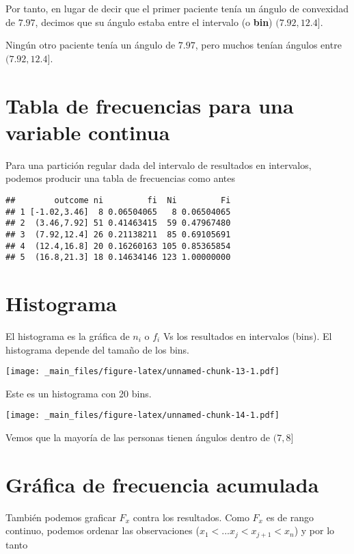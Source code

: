 \documentclass[
]{book}
\begin{document}
Por tanto, en lugar de decir que el primer paciente tenía un ángulo de convexidad de \(7.97\), decimos que su ángulo estaba entre el intervalo (o \textbf{bin}) \((7.92,12.4]\).

Ningún otro paciente tenía un ángulo de \(7.97\), pero muchos tenían ángulos entre \((7.92,12.4]\).

\hypertarget{tabla-de-frecuencias-para-una-variable-continua}{%
\section{Tabla de frecuencias para una variable continua}\label{tabla-de-frecuencias-para-una-variable-continua}}

Para una partición regular dada del intervalo de resultados en intervalos, podemos producir una tabla de frecuencias como antes

\begin{verbatim}
##        outcome ni         fi  Ni         Fi
## 1 [-1.02,3.46]  8 0.06504065   8 0.06504065
## 2  (3.46,7.92] 51 0.41463415  59 0.47967480
## 3  (7.92,12.4] 26 0.21138211  85 0.69105691
## 4  (12.4,16.8] 20 0.16260163 105 0.85365854
## 5  (16.8,21.3] 18 0.14634146 123 1.00000000
\end{verbatim}

\hypertarget{histograma}{%
\section{Histograma}\label{histograma}}

El histograma es la gráfica de \(n_i\) o \(f_i\) Vs los resultados en intervalos (bins). El histograma depende del tamaño de los bins.

\texttt{[image: \_main\_files/figure-latex/unnamed-chunk-13-1.pdf]}

Este es un histograma con 20 bins.

\texttt{[image: \_main\_files/figure-latex/unnamed-chunk-14-1.pdf]}

Vemos que la mayoría de las personas tienen ángulos dentro de \((7, 8]\)

\hypertarget{gruxe1fica-de-frecuencia-acumulada-1}{%
\section{Gráfica de frecuencia acumulada}\label{gruxe1fica-de-frecuencia-acumulada-1}}

También podemos graficar \(F_x\) contra los resultados. Como \(F_x\) es de rango continuo, podemos ordenar las observaciones (\(x_1 <... x_j < x_{j+1} < x_n\)) y por lo tanto
\end{document}
